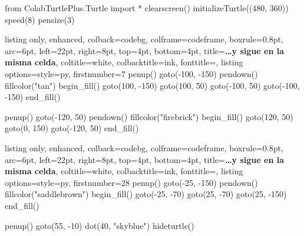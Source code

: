 \begin{typethis}
from ColabTurtlePlus.Turtle import *
clearscreen()
initializeTurtle((480, 360))
speed(8)
pensize(3)
\end{typethis}
\begin{tcbraster}[raster columns=2, raster column skip=10pt, raster valign=top]
\begin{tcblisting}{listing only, enhanced, colback=codebg, colframe=codeframe, boxrule=0.8pt, arc=6pt, left=22pt, right=8pt, top=4pt, bottom=4pt, title={\textbf{\ldots y sigue en la misma celda}}, coltitle=white, colbacktitle=ink, fonttitle=\small, listing options={style=py, firstnumber=7}}
penup()
goto(-100, -150)
pendown()
fillcolor("tan")
begin_fill()
goto(100, -150)
goto(100, 50)
goto(-100, 50)
goto(-100, -150)
end_fill()

penup()
goto(-120, 50)
pendown()
fillcolor("firebrick")
begin_fill()
goto(120, 50)
goto(0, 150)
goto(-120, 50)
end_fill()
\end{tcblisting}
\begin{tcblisting}{listing only, enhanced, colback=codebg, colframe=codeframe, boxrule=0.8pt, arc=6pt, left=22pt, right=8pt, top=4pt, bottom=4pt, title={\textbf{\ldots y sigue en la misma celda}}, coltitle=white, colbacktitle=ink, fonttitle=\small, listing options={style=py, firstnumber=28}}
penup()
goto(-25, -150)
pendown()
fillcolor("saddlebrown")
begin_fill()
goto(-25, -70)
goto(25, -70)
goto(25, -150)
end_fill()

penup()
goto(55, -10)
dot(40, "skyblue")
hideturtle()
\end{tcblisting}
\end{tcbraster}


